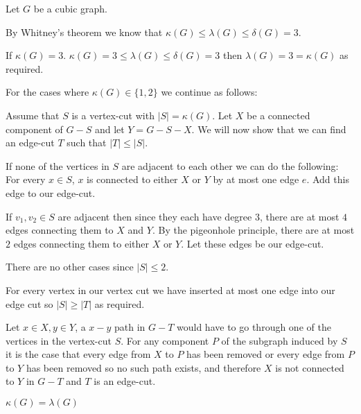Let $G$ be a cubic graph. 

By Whitney's theorem we know that $\kappa(G) \le \lambda(G) \le \delta(G) = 3 $.

If $\kappa(G) = 3$. $\kappa(G) = 3 \le \lambda(G) \le \delta(G) = 3$
then $\lambda(G) = 3 = \kappa(G)$ as required.

For the cases where $\kappa(G) \in \{1, 2\}$ we continue as follows:

Assume that $S$ is a vertex-cut with $|S| = \kappa(G)$. Let $X$ be a connected
component of $G-S$ and let $Y=G-S-X$.
We will now show that we can find an edge-cut $T$ such that $|T| \le |S|$.

If none of the vertices in $S$ are adjacent to each other we can do the following:
For every $x \in S$, $x$ is connected to either $X$ or $Y$ by at most one edge $e$. 
Add this edge to our edge-cut.

If $v_1, v_2 \in S$ are adjacent then since they each have degree $3$, there
are at most $4$ edges connecting them to $X$ and $Y$. By the pigeonhole principle,
there are at most $2$ edges connecting them to either $X$ or $Y$. Let these
edges be our edge-cut.

There are no other cases since $|S| \le 2$.

For every vertex in our vertex cut we have inserted at most one edge into our edge
cut so $|S| \ge |T|$ as required. 

Let $x\in X, y \in Y$, a $x-y$ path in $G-T$ would have to go through one of the
vertices in the vertex-cut $S$. For any component $P$ of the subgraph induced by $S$ it is the
case that every edge from $X$ to $P$ has been removed or every edge
from $P$ to $Y$ has been removed so no such path
exists, and therefore $X$ is not connected to $Y$ in $G-T$ and $T$ is an edge-cut.

$\kappa(G) = \lambda(G)$
